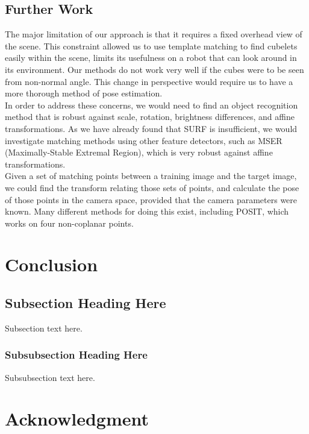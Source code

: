 \documentclass[conference]{IEEEtran}
\begin{document}
\subsection{Further Work}
The major limitation of our approach is that it requires a fixed overhead view of the scene.  This constraint allowed us to use template matching to find cubelets easily within the scene, limits its usefulness on a robot that can look around in its environment.  Our methods do not work very well if the cubes were to be seen from non-normal angle.  This change in perspective would require us to have a more thorough method of pose estimation.  
\\[6pt]
In order to address these concerns, we would need to find an object recognition method that is robust against scale, rotation, brightness differences, and affine transformations.  As we have already found that SURF is insufficient, we would investigate matching methods using other feature detectors, such as MSER (Maximally-Stable Extremal Region), which is very robust against affine transformations.
\\[6pt]
Given a set of matching points between a training image and the target image, we could find the transform relating those sets of points, and calculate the pose of those points in the camera space, provided that the camera parameters were known.  Many different methods for doing this exist, including POSIT, which works on four non-coplanar points.


\section{Conclusion}


\subsection{Subsection Heading Here}
Subsection text here.


\subsubsection{Subsubsection Heading Here}
Subsubsection text here.






\section*{Acknowledgment}
\end{document}
